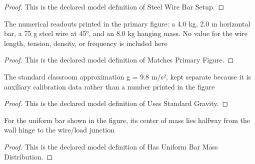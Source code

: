\begin{proof}
  This is the declared model definition of Steel Wire Bar Setup.
\end{proof}
\begin{definition}
  \label{def:physics:phyx-mini-0181:phyxminiproblems-problemphyxmini0181-matchesprimaryfigure}
  The numerical readouts printed in the primary figure: a 4.0 kg, 2.0 m horizontal bar, a 75 g steel wire at 45°, and an 8.0 kg hanging mass. No value for the wire length, tension, density, or frequency is included here
\end{definition}
\begin{proof}
  This is the declared model definition of Matches Primary Figure.
\end{proof}
\begin{definition}
  \label{def:physics:phyx-mini-0181:phyxminiproblems-problemphyxmini0181-usesstandardgravity}
  The standard classroom approximation g = 9.8 m/s², kept separate because it is auxiliary calibration data rather than a number printed in the figure
\end{definition}
\begin{proof}
  This is the declared model definition of Uses Standard Gravity.
\end{proof}
\begin{definition}
  \label{def:physics:phyx-mini-0181:phyxminiproblems-problemphyxmini0181-hasuniformbarmassdistribution}
  For the uniform bar shown in the figure, its center of mass lies halfway from the wall hinge to the wire/load junction
\end{definition}
\begin{proof}
  This is the declared model definition of Has Uniform Bar Mass Distribution.
\end{proof}
